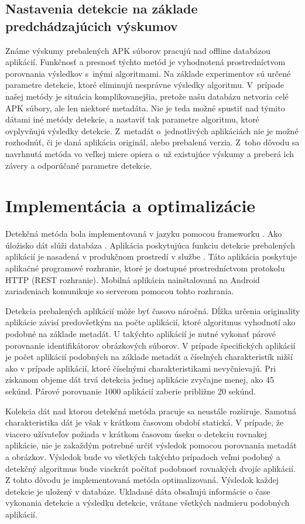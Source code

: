 \subsection*{Nastavenia detekcie na základe predchádzajúcich výskumov}
Známe výskumy prebalených APK súborov pracujú nad offline databázou aplikácií. Funkčnosť a presnosť týchto metód je vyhodnotená prostredníctvom porovnania výsledkov s~inými algoritmami. Na základe experimentov sú určené parametre detekcie, ktoré eliminujú nesprávne výsledky algoritmu. V~prípade našej metódy je situácia komplikovanejšia, pretože našu databázu netvoria celé APK súbory, ale len niektoré metadáta. Nie je teda možné spustiť nad týmito dátami iné metódy detekcie, a nastaviť tak parametre algoritmu, ktoré ovplyvňujú výsledky detekcie. Z~metadát o~jednotlivých aplikáciách nie je možné rozhodnúť, či je daná aplikácia originál, alebo prebalená verzia.  Z~toho dôvodu sa navrhnutá metóda vo veľkej miere opiera o~už existujúce výskumy a preberá ich závery a odporúčané parametre detekcie. 

\section{Implementácia a optimalizácie}
Detekčná metóda bola implementovaná v jazyku  pomocou frameworku . Ako úložisko dát slúži databáza . Aplikácia poskytujúca funkciu detekcie prebalených aplikácií je nasadená v produkčnom prostredí v službe . Táto aplikácia poskytuje aplikačné programové rozhranie, ktoré je dostupné prostredníctvom protokolu HTTP (REST rozhranie). Mobilná aplikácia nainštalovaná na Android zariadeniach komunikuje so serverom pomocou tohto rozhrania. 

Detekcia prebalených aplikácií môže byť časovo náročná. Dĺžka určenia originality aplikácie závisí predovšetkým na počte aplikácií, ktoré algoritmus vyhodnotí ako podobné na základe metadát. U takýchto aplikácií je nutné vykonať párové porovnanie identifikátorov obrázkových súborov. V prípade špecifických aplikácií je počet aplikácií podobných na základe metadát a číselných charakteristík nižší ako v prípade aplikácií, ktoré číselnými charakteristikami nevyčnievajú. Pri získanom objeme dát trvá detekcia jednej aplikácie zvyčajne menej, ako 45 sekúnd. Párové porovnanie 1000 aplikácií zaberie približne 20 sekúnd. 

Kolekcia dát nad ktorou detekčná metóda pracuje sa neustále rozširuje. Samotná charakteristika dát je však v krátkom časovom období statická. V prípade, že viacero užívateľov požiada v krátkom časovom úseku o detekciu rovnakej aplikácie, nie je zakaždým potrebné určiť  výsledok pomocou porovnania metadát a obrázkov. Výsledok bude vo všetkých takýchto prípadoch veľmi podobný a detekčný algoritmus bude viackrát počítať podobnosť rovnakých dvojíc aplikácií. Z tohto dôvodu je implementovaná metóda optimalizovaná. Výsledok každej detekcie je uložený v databáze. Ukladané dáta obsahujú informácie o čase vykonania detekcie a výsledku detekcie, vrátane všetkých nadmieru podobných aplikácií. 


